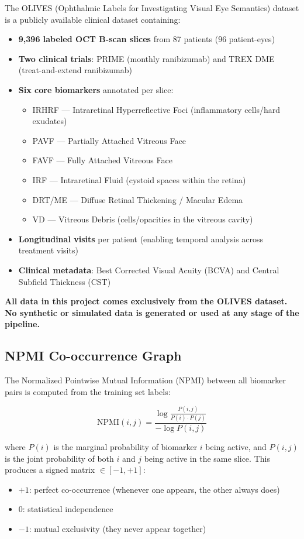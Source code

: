\documentclass[12pt,a4paper]{article}
\begin{document}
The OLIVES (Ophthalmic Labels for Investigating Visual Eye Semantics) dataset is a publicly available clinical dataset containing:
\begin{itemize}[nosep]
  \item \textbf{9,396 labeled OCT B-scan slices} from 87 patients (96 patient-eyes)
  \item \textbf{Two clinical trials}: PRIME (monthly ranibizumab) and TREX DME (treat-and-extend ranibizumab)
  \item \textbf{Six core biomarkers} annotated per slice:
    \begin{itemize}[nosep]
      \item IRHRF --- Intraretinal Hyperreflective Foci (inflammatory cells/hard exudates)
      \item PAVF --- Partially Attached Vitreous Face
      \item FAVF --- Fully Attached Vitreous Face
      \item IRF --- Intraretinal Fluid (cystoid spaces within the retina)
      \item DRT/ME --- Diffuse Retinal Thickening / Macular Edema
      \item VD --- Vitreous Debris (cells/opacities in the vitreous cavity)
    \end{itemize}
  \item \textbf{Longitudinal visits} per patient (enabling temporal analysis across treatment visits)
  \item \textbf{Clinical metadata}: Best Corrected Visual Acuity (BCVA) and Central Subfield Thickness (CST)
\end{itemize}

\textbf{All data in this project comes exclusively from the OLIVES dataset. No synthetic or simulated data is generated or used at any stage of the pipeline.}

\subsection{NPMI Co-occurrence Graph}

The Normalized Pointwise Mutual Information (NPMI) between all biomarker pairs is computed from the training set labels:

\begin{equation}
\text{NPMI}(i, j) = \frac{\log \frac{P(i, j)}{P(i) \cdot P(j)}}{-\log P(i, j)}
\end{equation}

where $P(i)$ is the marginal probability of biomarker $i$ being active, and $P(i,j)$ is the joint probability of both $i$ and $j$ being active in the same slice. This produces a signed matrix $\in [-1, +1]$:
\begin{itemize}[nosep]
  \item $+1$: perfect co-occurrence (whenever one appears, the other always does)
  \item $0$: statistical independence
  \item $-1$: mutual exclusivity (they never appear together)
\end{itemize}
\end{document}
